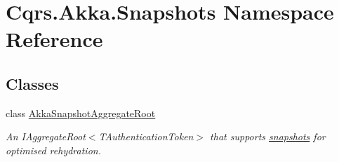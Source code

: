 \hypertarget{namespaceCqrs_1_1Akka_1_1Snapshots}{}\section{Cqrs.\+Akka.\+Snapshots Namespace Reference}
\label{namespaceCqrs_1_1Akka_1_1Snapshots}
\subsection*{Classes}
\begin{DoxyCompactItemize}
\item 
class \hyperlink{classCqrs_1_1Akka_1_1Snapshots_1_1AkkaSnapshotAggregateRoot}{Akka\+Snapshot\+Aggregate\+Root}
\begin{DoxyCompactList}\small\item\em An I\+Aggregate\+Root$<$\+T\+Authentication\+Token$>$ that supports \hyperlink{}{snapshots} for optimised rehydration. \end{DoxyCompactList}\end{DoxyCompactItemize}
